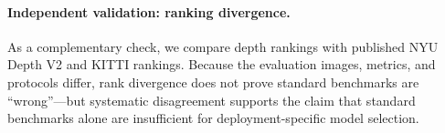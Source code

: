
\paragraph{Independent validation: ranking divergence.}
As a complementary check, we compare \coolname{} depth rankings with published NYU Depth V2 and KITTI rankings.
Because the evaluation images, metrics, and protocols differ, rank divergence does not prove standard benchmarks are ``wrong''---but systematic disagreement supports the claim that standard benchmarks alone are insufficient for deployment-specific model selection.
